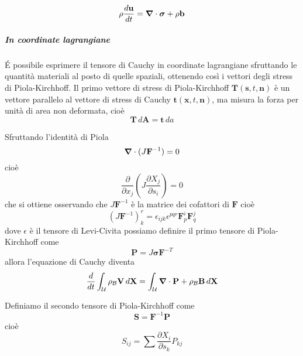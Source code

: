 \begin{equation*}
\rho\frac{d\mathbf{u}}{dt} = \boldsymbol{\nabla}\cdot \boldsymbol{\sigma} + \rho\mathbf{b}
\end{equation*}

\subparagraph{In coordinate lagrangiane}
\'E possibile esprimere il tensore di Cauchy in coordinate lagrangiane sfruttando le quantità materiali al posto di quelle spaziali, ottenendo così i vettori degli stress di Piola-Kirchhoff.
Il primo vettore di stress di Piola-Kirchhoff $\mathbf{T}(\mathbf{s},t,\mathbf{n})$ è un vettore parallelo al vettore di stress di Cauchy $\mathbf{t}(\mathbf{x},t,\mathbf{n})$, ma misura la forza per unità di area non deformata,
cioè
\begin{equation*}\mathbf{T}\,d\mathbf{A} = \mathbf{t}\,da
\end{equation*}

Sfruttando l'identità di Piola
\begin{equation*}
\boldsymbol{\nabla} \cdot (J\mathbf{F}^{-1}) = 0
\end{equation*}
cioè
\begin{equation*}
\frac{\partial}{\partial x_j}(J\frac{\partial X_j}{\partial s_i}) = 0
\end{equation*}
che si ottiene osservando che $J\mathbf{F}^{-1}$ è la matrice dei cofattori di $\mathbf{F}$ cioè
\begin{equation*}
(J\mathbf{F}^{-1})^r_k = \epsilon_{ijk}\epsilon^{pqr}\mathbf{F}^i_p\mathbf{F}^j_q
\end{equation*}
dove $\epsilon$ è il tensore di Levi-Civita possiamo definire il primo tensore di Piola-Kirchhoff come 
\begin{equation*}
\mathbf{P}=J\boldsymbol{\sigma}\mathbf{F}^{-T}
\end{equation*}
allora l'equazione di Cauchy diventa
\begin{equation*}
\frac{d}{dt}\int_{\mathcal{U}}\rho_{\mathcal{B}}\mathbf{V}\, d\mathbf{X} = \int_\mathcal{U}\boldsymbol{\nabla}\cdot\mathbf{P}+\rho_{\mathcal{B}}\mathbf{B}\, d\mathbf{X}
\end{equation*}

Definiamo il secondo tensore di Piola-Kirchhoff come
\begin{equation*}
\mathbf{S}=\mathbf{F}^{-1}\mathbf{P}
\end{equation*}
cioè
\begin{equation*}
S_{ij} = \sum \frac{\partial X_i}{\partial s_k}P_{kj}
\end{equation*}


